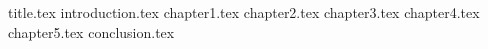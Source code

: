 \documentclass[a4paper,14pt]{extarticle}
\begin{document}
	 {title.tex}
	\clearpage
	\tableofcontents
	\clearpage
	\setcounter{page}{6}
	 {introduction.tex}
	\clearpage
	 {chapter1.tex}
	\clearpage
	 {chapter2.tex}
	\clearpage
	 {chapter3.tex}
	\clearpage
            {chapter4.tex}
	\clearpage
            {chapter5.tex}
	\clearpage
	 {conclusion.tex}
	\clearpage
	\renewcommand{\refname}{Список использованных источников}
	
           
\end{document}
